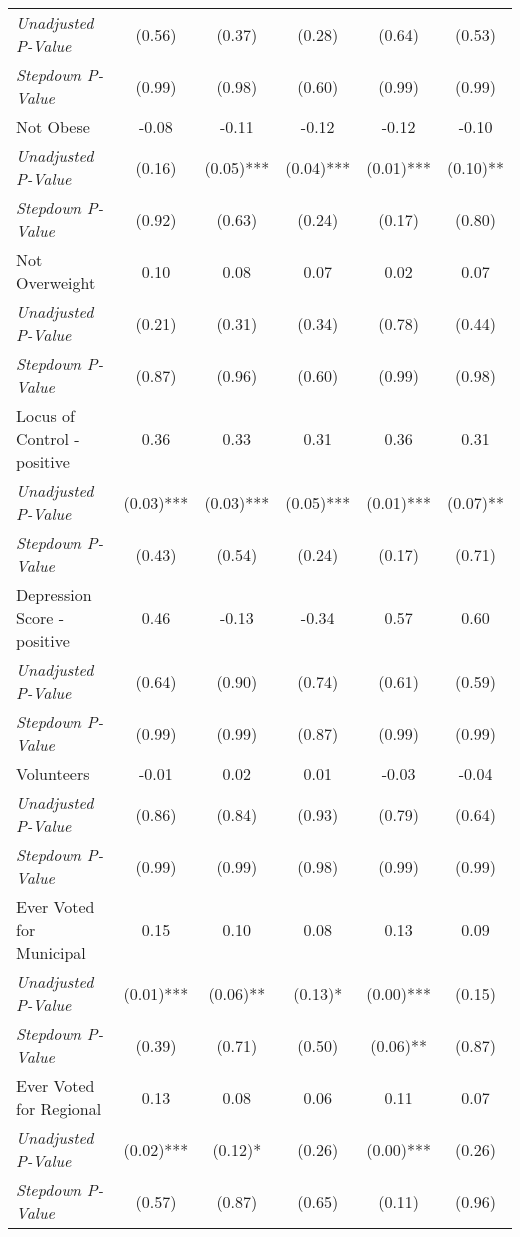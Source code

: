 \begin{tabular}{l c c c c c}
\quad \textit{Unadjusted P-Value} & (0.56) & (0.37) & (0.28) & (0.64) & (0.53) \\
\quad \textit{Stepdown P-Value} & (0.99) & (0.98) & (0.60) & (0.99) & (0.99) \\
Not Obese & -0.08 & -0.11 & -0.12 & -0.12 & -0.10 \\
\quad \textit{Unadjusted P-Value} & (0.16) & (0.05)*** & (0.04)*** & (0.01)*** & (0.10)** \\
\quad \textit{Stepdown P-Value} & (0.92) & (0.63) & (0.24) & (0.17) & (0.80) \\
Not Overweight & 0.10 & 0.08 & 0.07 & 0.02 & 0.07 \\
\quad \textit{Unadjusted P-Value} & (0.21) & (0.31) & (0.34) & (0.78) & (0.44) \\
\quad \textit{Stepdown P-Value} & (0.87) & (0.96) & (0.60) & (0.99) & (0.98) \\
Locus of Control - positive & 0.36 & 0.33 & 0.31 & 0.36 & 0.31 \\
\quad \textit{Unadjusted P-Value} & (0.03)*** & (0.03)*** & (0.05)*** & (0.01)*** & (0.07)** \\
\quad \textit{Stepdown P-Value} & (0.43) & (0.54) & (0.24) & (0.17) & (0.71) \\
Depression Score - positive & 0.46 & -0.13 & -0.34 & 0.57 & 0.60 \\
\quad \textit{Unadjusted P-Value} & (0.64) & (0.90) & (0.74) & (0.61) & (0.59) \\
\quad \textit{Stepdown P-Value} & (0.99) & (0.99) & (0.87) & (0.99) & (0.99) \\
Volunteers & -0.01 & 0.02 & 0.01 & -0.03 & -0.04 \\
\quad \textit{Unadjusted P-Value} & (0.86) & (0.84) & (0.93) & (0.79) & (0.64) \\
\quad \textit{Stepdown P-Value} & (0.99) & (0.99) & (0.98) & (0.99) & (0.99) \\
Ever Voted for Municipal & 0.15 & 0.10 & 0.08 & 0.13 & 0.09 \\
\quad \textit{Unadjusted P-Value} & (0.01)*** & (0.06)** & (0.13)* & (0.00)*** & (0.15) \\
\quad \textit{Stepdown P-Value} & (0.39) & (0.71) & (0.50) & (0.06)** & (0.87) \\
Ever Voted for Regional & 0.13 & 0.08 & 0.06 & 0.11 & 0.07 \\
\quad \textit{Unadjusted P-Value} & (0.02)*** & (0.12)* & (0.26) & (0.00)*** & (0.26) \\
\quad \textit{Stepdown P-Value} & (0.57) & (0.87) & (0.65) & (0.11) & (0.96) \\

\end{tabular}
